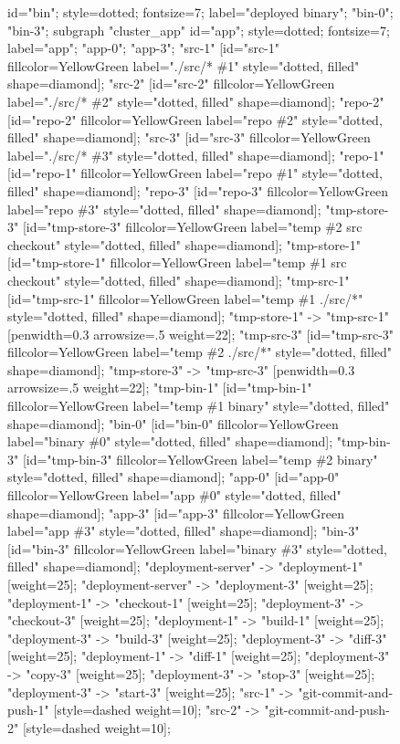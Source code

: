 \begin{figure}[p]
\begin{sideways}
{{id="bin";
style=dotted;
fontsize=7;
label="deployed binary";
"bin-0";
"bin-3";
}
subgraph "cluster_app" {
id="app";
style=dotted;
fontsize=7;
label="app";
"app-0";
"app-3";
}
"src-1" [id="src-1" fillcolor=YellowGreen label="./src/* \#1" style="dotted, filled" shape=diamond];
"src-2" [id="src-2" fillcolor=YellowGreen label="./src/* \#2" style="dotted, filled" shape=diamond];
"repo-2" [id="repo-2" fillcolor=YellowGreen label="repo \#2" style="dotted, filled" shape=diamond];
"src-3" [id="src-3" fillcolor=YellowGreen label="./src/* \#3" style="dotted, filled" shape=diamond];
"repo-1" [id="repo-1" fillcolor=YellowGreen label="repo \#1" style="dotted, filled" shape=diamond];
"repo-3" [id="repo-3" fillcolor=YellowGreen label="repo \#3" style="dotted, filled" shape=diamond];
"tmp-store-3" [id="tmp-store-3" fillcolor=YellowGreen label="temp \#2 src checkout" style="dotted, filled" shape=diamond];
"tmp-store-1" [id="tmp-store-1" fillcolor=YellowGreen label="temp \#1 src checkout" style="dotted, filled" shape=diamond];
"tmp-src-1" [id="tmp-src-1" fillcolor=YellowGreen label="temp \#1 ./src/*" style="dotted, filled" shape=diamond];
"tmp-store-1" -> "tmp-src-1" [penwidth=0.3 arrowsize=.5 weight=22];
"tmp-src-3" [id="tmp-src-3" fillcolor=YellowGreen label="temp \#2 ./src/*" style="dotted, filled" shape=diamond];
"tmp-store-3" -> "tmp-src-3" [penwidth=0.3 arrowsize=.5 weight=22];
"tmp-bin-1" [id="tmp-bin-1" fillcolor=YellowGreen label="temp \#1 binary" style="dotted, filled" shape=diamond];
"bin-0" [id="bin-0" fillcolor=YellowGreen label="binary \#0" style="dotted, filled" shape=diamond];
"tmp-bin-3" [id="tmp-bin-3" fillcolor=YellowGreen label="temp \#2 binary" style="dotted, filled" shape=diamond];
"app-0" [id="app-0" fillcolor=YellowGreen label="app \#0" style="dotted, filled" shape=diamond];
"app-3" [id="app-3" fillcolor=YellowGreen label="app \#3" style="dotted, filled" shape=diamond];
"bin-3" [id="bin-3" fillcolor=YellowGreen label="binary \#3" style="dotted, filled" shape=diamond];
"deployment-server" -> "deployment-1" [weight=25];
"deployment-server" -> "deployment-3" [weight=25];
"deployment-1" -> "checkout-1" [weight=25];
"deployment-3" -> "checkout-3" [weight=25];
"deployment-1" -> "build-1" [weight=25];
"deployment-3" -> "build-3" [weight=25];
"deployment-3" -> "diff-3" [weight=25];
"deployment-1" -> "diff-1" [weight=25];
"deployment-3" -> "copy-3" [weight=25];
"deployment-3" -> "stop-3" [weight=25];
"deployment-3" -> "start-3" [weight=25];
"src-1" -> "git-commit-and-push-1" [style=dashed weight=10];
"src-2" -> "git-commit-and-push-2" [style=dashed weight=10];
}
\end{sideways}
\end{figure}
